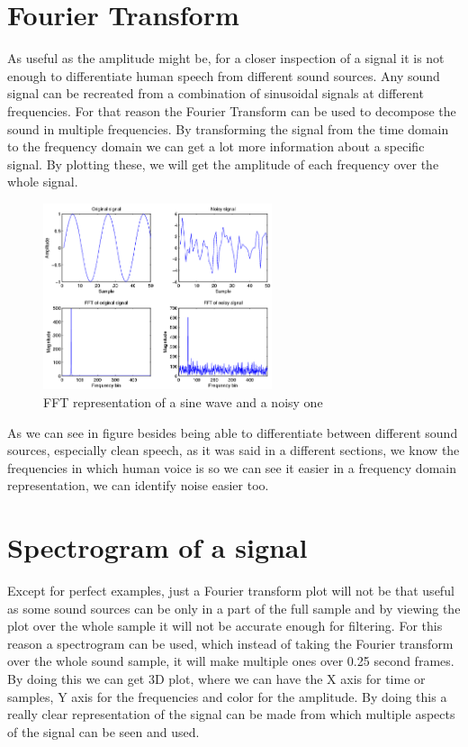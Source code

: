 \section{Fourier Transform}
As useful as the amplitude might be, for a closer inspection of a signal it is not enough to 
differentiate human speech from different sound sources. Any sound signal can be recreated from 
a combination of sinusoidal signals at different frequencies.  For that reason the Fourier 
Transform can be used to decompose the sound in multiple frequencies. By transforming the 
signal from the time domain to the frequency domain we can get a lot more information about 
a specific signal. By plotting these, we will get the amplitude of each frequency over the whole signal.

\begin{figure}[htp]
	\centering
	\includegraphics[width=0.6\textwidth]{Illustrations/fftSignals.png}
	\caption{FFT representation of a sine wave and a noisy one}
	\label{fig:fftSignal}
\end{figure}
\newpage

As we can see in figure  besides being able to differentiate between 
different sound sources, especially clean speech, as it was said in a different sections, we 
know the frequencies in which human voice is so we can see it easier in a frequency domain representation, 
we can identify noise easier too.

\section{Spectrogram of a signal}
Except for perfect examples, just a Fourier transform plot will not be that useful as some
sound sources can be only in a part of the full sample and by viewing the plot over the 
whole sample it will not be accurate enough for filtering. For this reason a spectrogram 
can be used, which instead of taking the Fourier transform over the whole sound sample, it 
will make multiple ones over 0.25 second frames. By doing this we can get 3D plot, where we 
can have the X axis for time or samples, Y axis for the frequencies and color for the amplitude. 
By doing this a really clear representation of the signal can be made from which multiple aspects 
of the signal can be seen and used.

